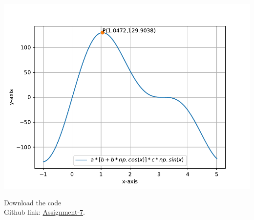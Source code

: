 \documentclass[10pt,a4paper]{report}
\begin{document}
\begin{multicols}{2}
\includegraphics[scale=0.6]{../figs/optm.pdf} 
\raggedright  Download the code \\
Github link: \href{https://github.com/KrishnaYadati/Assignments/blob/main/optimization/codes/opt.py}{Assignment-7}.
  \end{multicols}
\end{document}
